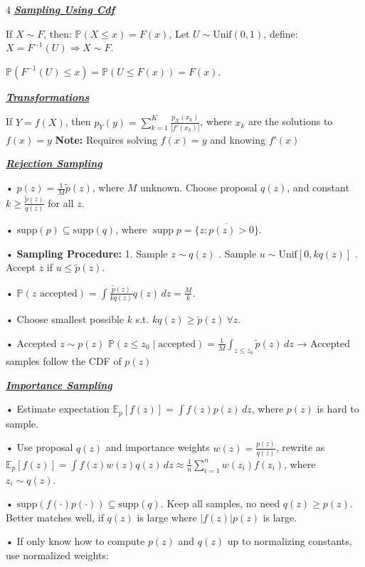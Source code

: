 \documentclass[10pt]{article}
\newcommand{\bulletPoint}[1]{\ul{\textit{\textbf{#1}}}}
\begin{document}
\begin{multicols*}{4}
\bulletPoint{Sampling Using Cdf}\quad

If \( X \sim F \), then:
$\mathbb{P}(X \leq x) = F(x)$, \quad
Let \( U \sim \text{Unif}(0,1) \), define:
$X = F^{-1}(U)
\Rightarrow X \sim F$. 

$\mathbb{P}(F^{-1}(U) \leq x) = \mathbb{P}(U \leq F(x)) = F(x)$. 

\bulletPoint{Transformations}\quad

If \( Y = f(X) \), then \( p_Y(y) = \sum_{k=1}^K \frac{p_X(x_k)}{|f'(x_k)|} \), where \( x_k \) are the solutions to \( f(x) = y \)
\quad\textbf{Note:} Requires solving \( f(x) = y \) and knowing \( f'(x) \)


\bulletPoint{Rejection Sampling}\quad

• \( p(z) = \frac{1}{M} \tilde{p}(z) \), where \( M \) unknown. 
Choose proposal \( q(z) \), and constant \( k \geq \frac{\tilde{p}(z)}{q(z)} \) for all \( z \). 

• \( \text{supp}(p) \subseteq \text{supp}(q) \), where $\operatorname{supp} p = \overline{ \{ z : p(z) > 0 \} }$. 

• \textbf{Sampling Procedure:}
1. Sample \( z \sim q(z) \) . Sample \( u \sim \text{Unif}[0, kq(z)] \) . Accept \( z \) if \( u \leq \tilde{p}(z) \). 

• $\mathbb{P}(z\text{ accepted}) = \int \frac{\tilde{p}(z)}{kq(z)} q(z)\,dz = \frac{M}{k}$. \quad

• Choose smallest possible \( k \) s.t. \( kq(z) \geq \tilde{p}(z) \ \forall z \). \quad

• Accepted \( z \sim p(z) \)
$\mathbb{P}(z \leq z_0 \mid \text{accepted}) = \frac{1}{M} \int_{z \leq z_0} \tilde{p}(z)\,dz$
→ Accepted samples follow the CDF of \( p(z) \)

\bulletPoint{Importance Sampling}\quad

• Estimate expectation $\mathbb{E}_p[f(z)] = \int f(z)p(z)\,dz$, where $p(z)$ is hard to sample.  

• Use proposal $q(z)$ and importance weights $w(z) = \frac{p(z)}{q(z)}$, rewrite as  
$\mathbb{E}_p[f(z)] = \int f(z)w(z)q(z)\,dz \approx \frac{1}{n} \sum_{i=1}^n w(z_i)f(z_i)$, where $z_i \sim q(z)$. 

• $\text{supp}(f(\cdot)p(\cdot)) \subseteq \text{supp}(q)$. Keep all samples, no need $q(z) \geq p(z)$. Better matches well, if $q(z)$ is large where $|f(z)|p(z)$ is large. 

• If only know how to compute $p(z)$ and $q(z)$ up to normalizing constants, use normalized weights:   


\end{multicols*}
\end{document}
